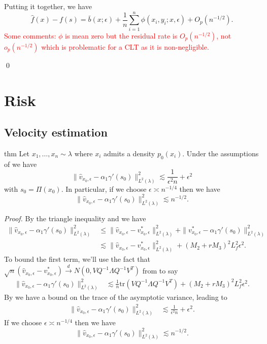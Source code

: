 \documentclass[11pt]{article}
\begin{document}
Putting it together, we have 
\begin{equation}
    \hat{f}(x) - f(s) = \bar{b}(x; \epsilon) + \frac{1}{n}\sum_{i = 1}^n\phi (x_i, y_i; x, \epsilon) + O_p(n^{-1/2}).
\end{equation}
\textcolor{red}{Some comments: $\phi$ is mean zero but the residual rate is $O_p(n^{-1/2})$, not $o_p(n^{-1/2})$ which is problematic for a CLT as it is non-negligible.}

\qed{}

\section{Risk}
\subsection{Velocity estimation}
\begin{restatable}{thm}{} \label{thm: velocity risk}
    Let $x_1, \dots, x_n \sim \lambda$ where $x_i$ admits a density $p_0(x_i)$. Under the assumptions of  we have
    \[\|\hat{v}_{x_0, \epsilon} - \alpha_1\gamma'(s_0)\|_{L^2(\lambda)}^2 \lesssim \frac{1}{\epsilon^2n} + \epsilon^2 \]
    with $s_0 = \Pi(x_0)$. In particular, if we choose $\epsilon \asymp n^{-1/4}$ then we have
    \[\|\hat{v}_{x_0, \epsilon} - \alpha_1\gamma'(s_0)\|_{L^2(\lambda)}^2 \lesssim n^{-1/2}. \]
\end{restatable}
\noindent \textit{Proof.} By the triangle inequality and  we have
\begin{align}
    \|\hat{v}_{x_0, \epsilon} - \alpha_1\gamma'(s_0)\|_{L^2(\lambda)}^2 &\leq \|\hat{v}_{x_0, \epsilon} - v^*_{x_0, \epsilon} \|_{L^2(\lambda)}^2 + \|v^*_{x_0, \epsilon}  - \alpha_1\gamma'(s_0)\|_{L^2(\lambda)}^2 \\
    &\lesssim  \|\hat{v}_{x_0, \epsilon} - v^*_{x_0, \epsilon} \|_{L^2(\lambda)}^2 + (M_2 + rM_3)^2L_f^2\epsilon^2.
\end{align}
To bound the first term, we'll use the fact that $\sqrt{n}(\hat{v}_{x_0, \epsilon} - v^*_{x_0, \epsilon}) \overset{d}{\rightarrow}N(0, VQ^{-1}\Lambda Q^{-1}V^T)$ from  to say
\begin{align}
    \|\hat{v}_{x_0, \epsilon} - \alpha_1\gamma'(s_0)\|_{L^2(\lambda)}^2
    &\lesssim  \frac{1}{n}\text{tr}\left( VQ^{-1}\Lambda Q^{-1}V^T\right) + (M_2 + rM_3)^2L_f^2\epsilon^2.
\end{align}
By  we have a bound on the trace of the asymptotic variance, leading to
\begin{align}
    \|\hat{v}_{x_0, \epsilon} - \alpha_1\gamma'(s_0)\|_{L^2(\lambda)}^2
    &\lesssim  \frac{1}{\epsilon^2n} + \epsilon^2.
\end{align}
If we choose $\epsilon \asymp n^{-1/4}$ then we have
\[\|\hat{v}_{x_0, \epsilon} - \alpha_1\gamma'(s_0)\|_{L^2(\lambda)}^2 \lesssim n^{-1/2}. \]
\end{document}
